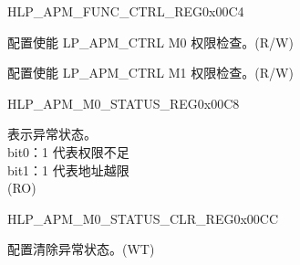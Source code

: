 \begin{register}{H}{LP\_APM\_FUNC\_CTRL\_REG}{0x00C4}\label{regdesc:LPAPMFUNCCTRLREG}
%
%
%
\regnewline%
\begin{regdesc}\begin{reglist}
\label{fielddesc:LPAPMM0FUNCEN}\item [LP\_APM\_M0\_FUNC\_EN] 配置使能 LP\_APM\_CTRL M0 权限检查。(R/W)
\label{fielddesc:LPAPMM1FUNCEN}\item [LP\_APM\_M1\_FUNC\_EN] 配置使能 LP\_APM\_CTRL M1 权限检查。(R/W)
\end{reglist}\end{regdesc}
\end{register}


\begin{register}{H}{LP\_APM\_M0\_STATUS\_REG}{0x00C8}\label{regdesc:LPAPMM0STATUSREG}
%
%
\regnewline%
\begin{regdesc}\begin{reglist}
\label{fielddesc:LPAPMM0EXCEPTIONSTATUS}\item [LP\_APM\_M0\_EXCEPTION\_STATUS] 表示异常状态。\\
bit0：1 代表权限不足 \\
bit1：1 代表地址越限  \\ (RO)
\end{reglist}\end{regdesc}
\end{register}


\begin{register}{H}{LP\_APM\_M0\_STATUS\_CLR\_REG}{0x00CC}\label{regdesc:LPAPMM0STATUSCLRREG}
%
%
\regnewline%
\begin{regdesc}\begin{reglist}
\label{fielddesc:LPAPMM0EXCEPTIONSTATUSCLR}\item [LP\_APM\_M0\_EXCEPTION\_STATUS\_CLR] 配置清除异常状态。(WT)
\end{reglist}\end{regdesc}
\end{register}


